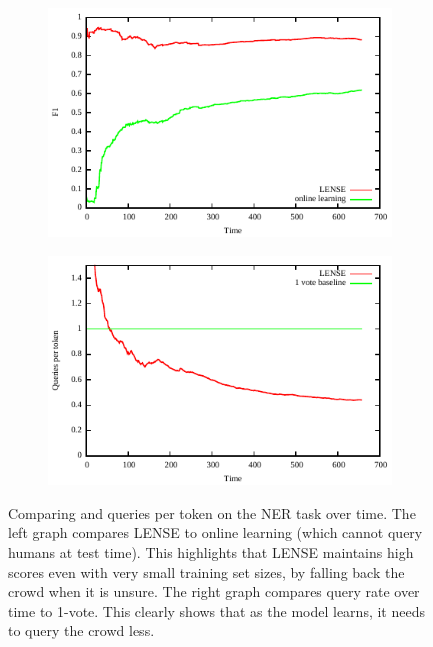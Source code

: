 \begin{figure}[!p]
  \centering
  \begin{subfigure}[b]{0.8\textwidth}
  \includegraphics[width=\textwidth]{figures/ner_2_class/f1_plot/f1_vs_time.pdf}
\end{subfigure}

  \begin{subfigure}[b]{0.8\textwidth}
  \includegraphics[width=\textwidth]{figures/ner_2_class/cost_plot/cost_vs_time.pdf}
  \end{subfigure}
  \caption[Comparing \fone{} and queries per token on the NER task over time.]{\label{fig:ner-f1} Comparing \fone{} and queries per token on the NER task over time. The left graph compares LENSE to online learning (which cannot query humans at test time). This highlights that LENSE maintains high \fone{} scores even with very small training set sizes, by falling back the crowd when it is unsure. The right graph compares query rate over time to 1-vote. This clearly shows that as the model learns, it needs to query the crowd less.}

\end{figure}

